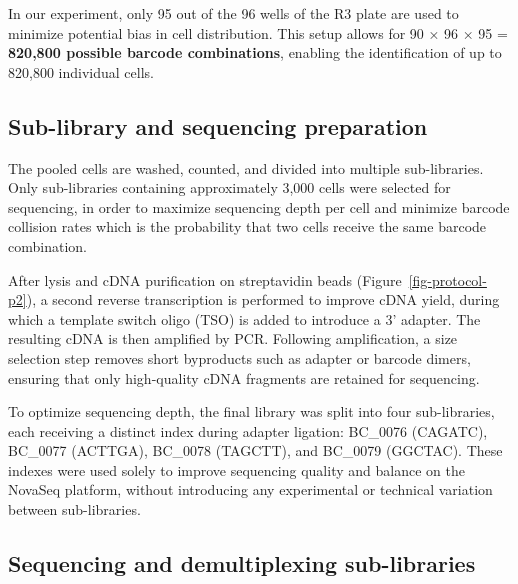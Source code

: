 \documentclass[
  11pt,
  a4paper,
]{report}
\begin{document}
\begin{tcolorbox}[enhanced jigsaw, colbacktitle=quarto-callout-warning-color!10!white, bottomtitle=1mm, coltitle=black, colframe=quarto-callout-warning-color-frame, left=2mm, bottomrule=.15mm, rightrule=.15mm, opacityback=0, toptitle=1mm, colback=white, title=\textcolor{quarto-callout-warning-color}{\faExclamationTriangle}\hspace{0.5em}{Warning}, arc=.35mm, toprule=.15mm, breakable, leftrule=.75mm, opacitybacktitle=0.6, titlerule=0mm]

In our experiment, only 95 out of the 96 wells of the R3 plate are used
to minimize potential bias in cell distribution. This setup allows for
90 × 96 × 95 = \textbf{820,800 possible barcode combinations}, enabling
the identification of up to 820,800 individual cells.

\end{tcolorbox}

\subsection{Sub-library and sequencing
preparation}\label{sub-library-and-sequencing-preparation}

The pooled cells are washed, counted, and divided into multiple
sub-libraries. Only sub-libraries containing approximately 3,000 cells
were selected for sequencing, in order to maximize sequencing depth per
cell and minimize barcode collision rates which is the probability that
two cells receive the same barcode combination.

After lysis and cDNA purification on streptavidin beads
(Figure~\ref{fig-protocol-p2}), a second reverse transcription is
performed to improve cDNA yield, during which a template switch oligo
(TSO) is added to introduce a 3' adapter. The resulting cDNA is then
amplified by PCR. Following amplification, a size selection step removes
short byproducts such as adapter or barcode dimers, ensuring that only
high-quality cDNA fragments are retained for sequencing.

To optimize sequencing depth, the final library was split into four
sub-libraries, each receiving a distinct index during adapter ligation:
BC\_0076 (CAGATC), BC\_0077 (ACTTGA), BC\_0078 (TAGCTT), and BC\_0079
(GGCTAC). These indexes were used solely to improve sequencing quality
and balance on the NovaSeq platform, without introducing any
experimental or technical variation between sub-libraries.

\subsection{Sequencing and demultiplexing
sub-libraries}\label{sequencing-and-demultiplexing-sub-libraries}
\end{document}
